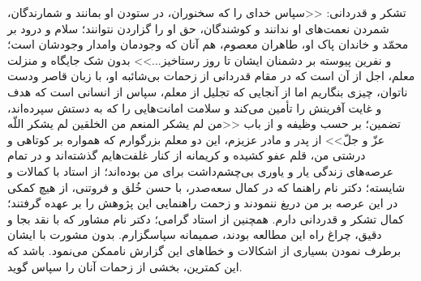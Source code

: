 \gratitude
{تشکر و قدردانی:}
{<<سپاس خدای را که سخنوران، در ستودن او بمانند و شمارندگان، شمردن نعمت‌های او ندانند و کوشندگان، حق او را گزاردن نتوانند؛ سلام و درود بر محمّد و خاندان پاک او، طاهران معصوم، هم آنان که وجودمان وامدار وجودشان است؛ و نفرین پیوسته بر دشمنان ایشان تا روز رستاخیز...>>}
{بدون شک جایگاه و منزلت معلم، اجل از آن است که در مقام قدردانی از زحمات بی‌شائبه او، با زبان قاصر ودست ناتوان، چیزی بنگاریم اما از آنجایی که تجلیل از معلم، سپاس از انسانی است که هدف و غایت آفرینش را تأمین می‌کند و سلامت امانت‌هایی را که به دستش سپرده‌اند، تضمین؛ بر حسب وظیفه و از باب <<من لم یشکر المنعم من الخلقین لم یشکر اللّه عزّ و جلّ>> از پدر و مادر عزیزم، این دو معلم بزرگوارم که همواره بر کوتاهی و درشتی من، قلم عفو کشیده و کریمانه از کنار غلفت‌هایم گذشته‌اند و در تمام عرصه‌های زندگی یار و یاوری بی‌چشم‌داشت برای من بوده‌اند؛ از استاد با کمالات و شایسته؛ دکتر}
{نام راهنما}
{که در کمال سعه‌صدر، با حسن خُلق و فروتنی، از هیچ کمکی در این عرصه بر من دریغ ننمودند و زحمت راهنمایی این پژوهش را بر عهده گرفتند؛ کمال تشکر و قدردانی دارم. همچنین از استاد گرامی؛ دکتر}
{نام مشاور}
{که با نقد بجا و دقیق، چراغ راه این مطالعه بودند، صمیمانه سپاسگزارم. بدون مشورت با ایشان برطرف‌ نمودن بسیاری از اشکالات و خطاهای این گزارش ناممکن می‌نمود.}
{باشد که این کمترین، بخشی از زحمات آنان را سپاس گوید.}
